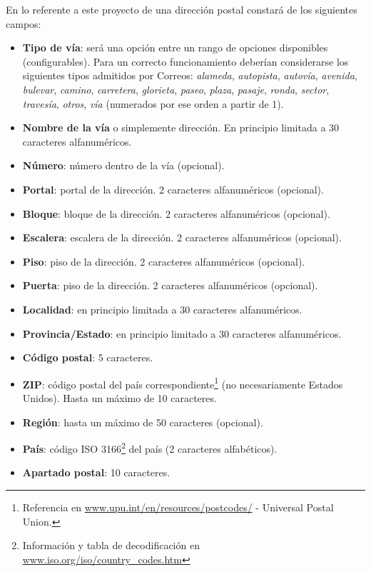 \documentclass[11pt, a4paper, twoside]{report}
\begin{document}
					En lo referente a este proyecto de \software una dirección postal constará de los siguientes campos:
					\begin{itemize}
						\item \textbf{Tipo de vía}: será una opción entre un rango de opciones disponibles (configurables). Para un correcto funcionamiento deberían considerarse los siguientes tipos admitidos por Correos: \textit{alameda}, \textit{autopista}, \textit{autovía}, \textit{avenida}, \textit{bulevar}, \textit{camino}, \textit{carretera}, \textit{glorieta}, \textit{paseo}, \textit{plaza}, \textit{pasaje}, \textit{ronda}, \textit{sector}, \textit{travesía}, \textit{otros}, \textit{vía} (numerados por ese orden a partir de 1).
						\item \textbf{Nombre de la vía} o simplemente dirección. En principio limitada a 30 caracteres alfanuméricos.
						\item \textbf{Número}: número dentro de la vía (opcional).
						\item \textbf{Portal}: portal de la dirección. 2 caracteres alfanuméricos (opcional).
						\item \textbf{Bloque}: bloque de la dirección. 2 caracteres alfanuméricos (opcional).
						\item \textbf{Escalera}: escalera de la dirección. 2 caracteres alfanuméricos (opcional).
						\item \textbf{Piso}: piso de la dirección. 2 caracteres alfanuméricos (opcional).
						\item \textbf{Puerta}: piso de la dirección. 2 caracteres alfanuméricos (opcional).
						\item \textbf{Localidad}: en principio limitada a 30 caracteres alfanuméricos.
						\item \textbf{Provincia/Estado}: en principio limitado a 30 caracteres alfanuméricos.
						\item \textbf{Código postal}: 5 caracteres.
						\item \textbf{ZIP}: código postal del país correspondiente\footnote{Referencia en \url{www.upu.int/en/resources/postcodes/} - Universal Postal Union.} (no necesariamente Estados Unidos). Hasta un máximo de 10 caracteres.
						\item \textbf{Región}: hasta un máximo de 50 caracteres (opcional).
						\item \textbf{País}: código ISO 3166\footnote{Información y tabla de decodificación en \url{www.iso.org/iso/country_codes.htm}} del país (2 caracteres alfabéticos).
						\item \textbf{Apartado postal}: 10 caracteres.
					\end{itemize}
\end{document}

